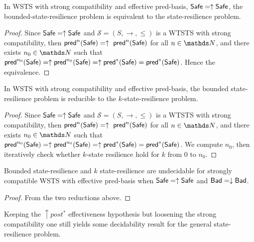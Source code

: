 \begin{proposition}
In WSTS with strong compatibility and effective pred-basis,  $\textsf{Safe}=\uparrow \textsf{Safe}$, the bounded-state-resilience problem is equivalent to the state-resilience problem.
\end{proposition}

\begin{proof}
Since $\textsf{Safe}=\uparrow \textsf{Safe}$ and
$\mathscr{S}=(S,\rightarrow,\leq)$ is a WTSTS with strong %
compatibility, then $\textsf{pred}^n(\textsf{Safe})= \uparrow~\textsf{pred}^n(\textsf{Safe})$ for all $n \in \N$,
and there exists $n_0 \in \N$ such that 
$\textsf{pred}^{n_0}(\textsf{Safe}) = \uparrow \textsf{pred}^{n_0}(\textsf{Safe}) = \uparrow \textsf{pred}^*(\textsf{Safe}) = \textsf{pred}^*(\textsf{Safe})$.
Hence the equivalence.
\end{proof}

\begin{proposition}
In WSTS with strong compatibility and effective pred-basis, the bounded state-resilience problem is
reducible to the $k$-state-resilience problem.
\end{proposition}

\begin{proof}
Since $\textsf{Safe}=\uparrow \textsf{Safe}$ and
$\mathscr{S}=(S,\rightarrow,\leq)$ is a WTSTS with strong %
compatibility, then $\textsf{pred}^n(\textsf{Safe})= \uparrow~\textsf{pred}^n(\textsf{Safe})$ for all $n \in \N$,
and there exists $n_0 \in \N$ such that 
$\textsf{pred}^{n_0}(\textsf{Safe}) = \uparrow \textsf{pred}^{n_0}(\textsf{Safe}) = \uparrow \textsf{pred}^*(\textsf{Safe}) = \textsf{pred}^*(\textsf{Safe})$.
We compute 
$n_0$, then iteratively check whether $k$-state resilience hold for $k$ from $0$ to $n_0$.  
\end{proof}

\begin{corollary}\label{bsrp up down}
Bounded state-resilience and 
$k$ state-resilience are undecidable for strongly compatible WSTS with effective pred-basis
when
$\textsf{Safe}=\uparrow \textsf{Safe}$
and $\textsf{Bad}=\downarrow \textsf{Bad}$.
\end{corollary}

\begin{proof} 
  From the two reductions above. 
\end{proof}











Keeping the $\uparrow post^*$ effectiveness hypothesis but loosening the strong compatibility one still yields some decidability result for the general state-resilience problem.


